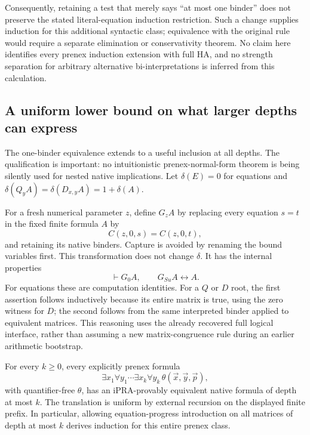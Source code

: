 Consequently, retaining a test that merely says ``at most one binder''
does not preserve the stated literal-equation induction restriction.
Such a change supplies induction for this additional syntactic class;
equivalence with the original rule would require a separate elimination
or conservativity theorem. No claim here identifies every prenex
induction extension with full HA, and no strength separation for
arbitrary alternative bi-interpretations is inferred from this calculation.

\subsection{A uniform lower bound on what larger depths can express}

The one-binder equivalence extends to a useful inclusion at all depths.
The qualification is important: no intuitionistic prenex-normal-form
theorem is being silently used for nested native implications.
Let $\delta(E)=0$ for equations and
$\delta(Q_yA)=\delta(D_{x,y}A)=1+\delta(A)$.

For a fresh numerical parameter $z$, define $G_zA$ by replacing every
equation $s=t$ in the fixed finite formula $A$ by
\[
                 C(z,0,s)=C(z,0,t),
\]
and retaining its native binders. Capture is avoided by renaming the
bound variables first. This transformation does not change $\delta$.
It has the internal properties
\[
             \vdash G_0A,\qquad G_{Su}A\leftrightarrow A.
\tag{Gate}\label{eq:depth-gate}
\]
For equations these are computation identities. For a $Q$ or $D$ root,
the first assertion follows inductively because its entire matrix is
true, using the zero witness for $D$; the second follows from the same
interpreted binder applied to equivalent matrices. This reasoning uses
the already recovered full logical interface, rather than assuming a
new matrix-congruence rule during an earlier arithmetic bootstrap.

\begin{theorem}
For every $k\geq0$, every explicitly prenex formula
\[
 \exists x_1\forall y_1\cdots\exists x_k\forall y_k\,
 \theta(\vec x,\vec y,\vec p),
\]
with quantifier-free $\theta$, has an iPRA-provably equivalent native
formula of depth at most $k$. The translation is uniform by external
recursion on the displayed finite prefix. In particular, allowing
equation-progress introduction on all matrices of depth at most $k$
derives induction for this entire prenex class.
\end{theorem}


